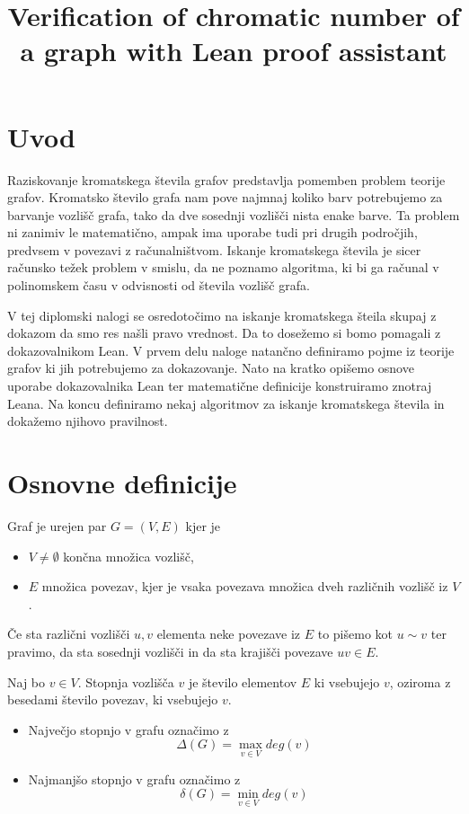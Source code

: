 \documentclass[mat1]{fmfdelo}
\title{Verification of chromatic number of a graph with Lean proof assistant}
\begin{document}
\section{Uvod}
Raziskovanje kromatskega števila grafov predstavlja pomemben problem teorije grafov.
Kromatsko število grafa nam pove najmnaj koliko barv potrebujemo za barvanje vozlišč grafa, tako da dve sosednji vozlišči nista enake barve.
Ta problem ni zanimiv le matematično, ampak ima uporabe tudi pri drugih področjih, predvsem v povezavi z računalništvom. 
Iskanje kromatskega števila je sicer računsko težek problem v smislu, da ne poznamo algoritma, ki bi ga računal v polinomskem času v odvisnosti od števila vozlišč grafa.

V tej diplomski nalogi se osredotočimo na iskanje kromatskega šteila skupaj z dokazom da smo res našli pravo vrednost.
Da to dosežemo si bomo pomagali z dokazovalnikom Lean.
V prvem delu naloge natančno definiramo pojme iz teorije grafov ki jih potrebujemo za dokazovanje. Nato na kratko opišemo osnove uporabe dokazovalnika
Lean ter matematične definicije konstruiramo znotraj Leana. 
Na koncu definiramo nekaj algoritmov za iskanje kromatskega števila in dokažemo njihovo pravilnost. 

\section{Osnovne definicije}

\begin{definicija}
    Graf je urejen par $G=(V, E)$ kjer je 
    \begin{itemize}
      \item $V\neq \emptyset$ končna množica vozlišč,
      \item $E$ množica povezav, kjer je vsaka povezava množica dveh različnih vozlišč iz $V$. 
    \end{itemize}
\end{definicija}
Če sta različni vozlišči $u, v$ elementa neke povezave iz $E$ to pišemo kot $u\sim v$ ter pravimo, da sta sosednji vozlišči in da sta krajišči povezave $uv\in E$.

\begin{definicija}
    Naj bo $v\in V$. Stopnja vozlišča $v$ je število elementov $E$ ki vsebujejo $v$, oziroma z besedami število povezav, ki vsebujejo $v$. 
\end{definicija}

\begin{itemize}
    \item Največjo stopnjo v grafu označimo z \[\Delta (G) = \max_{v\in V} deg(v)\]
    \item Najmanjšo stopnjo v grafu označimo z \[\delta (G) = \min_{v\in V} deg(v)\]
\end{itemize}
\end{document}
